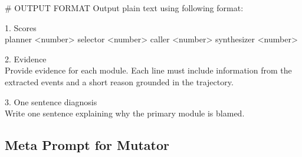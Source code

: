 \documentclass[11pt]{article}
\begin{document}
\begin{promptbox}
\vspace{1em}
\# OUTPUT FORMAT
Output plain text using following format:


1. Scores \\
planner \textless number\textgreater
selector \textless number\textgreater
caller \textless number\textgreater
synthesizer \textless number\textgreater
\vspace{0.5em}

2. Evidence \\
Provide evidence for each module. Each line must include information from the extracted events
and a short reason grounded in the trajectory.
\vspace{0.5em}

3. One sentence diagnosis \\
Write one sentence explaining why the primary module is blamed.
\end{promptbox}





\subsection{Meta Prompt for Mutator}
\end{document}
